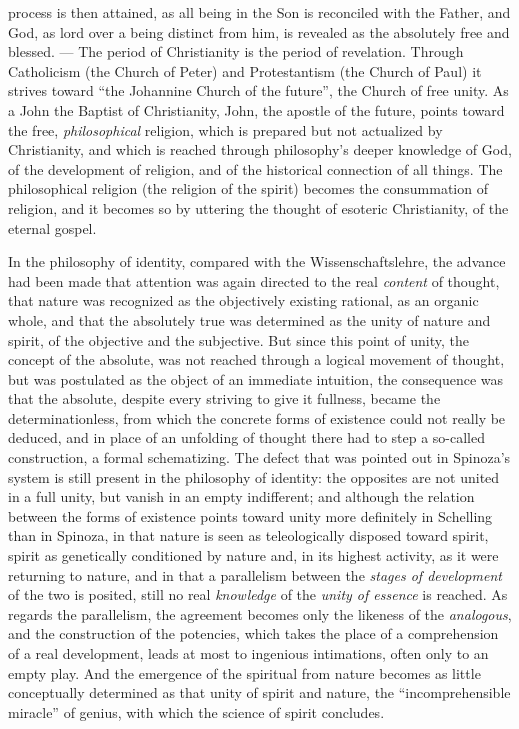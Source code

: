 process is then attained, as all being in the Son is reconciled with the
Father, and God, as lord over a being distinct from him, is revealed as
the absolutely free and blessed. --- The period of Christianity is the
period of revelation. Through Catholicism (the Church of Peter) and
Protestantism (the Church of Paul) it strives toward ``the Johannine
Church of the future'', the Church of free unity. As a John the Baptist
of Christianity, John, the apostle of the future, points toward the free,
\emph{philosophical} religion, which is prepared but not actualized by
Christianity, and which is reached through philosophy's deeper knowledge
of God, of the development of religion, and of the historical connection
of all things. The philosophical religion (the religion of the spirit)
becomes the consummation of religion, and it becomes so by uttering the
thought of esoteric Christianity, of the eternal gospel.

\divrule

In the philosophy of identity, compared with the Wissenschaftslehre,
the advance had been made that attention was again directed to the
real \emph{content} of thought, that nature was recognized as the
objectively existing rational, as an organic whole, and that the
absolutely true was determined as the unity of nature and spirit, of
the objective and the subjective. But since this point of unity, the
concept of the absolute, was not reached through a logical movement of
thought, but was postulated as the object of an immediate intuition,
the consequence was that the absolute, despite every
striving to give it fullness, became the determinationless, from which
the concrete forms of existence could not really be deduced, and in
place of an unfolding of thought there had to step a so-called
construction, a formal schematizing. The defect that was pointed out in
Spinoza's system is still present in the philosophy of identity: the
opposites are not united in a full unity, but vanish in an empty
indifferent; and although the relation between the forms of existence
points toward unity more definitely in Schelling than in Spinoza, in
that nature is seen as teleologically disposed toward spirit, spirit
as genetically conditioned by nature and, in its highest activity, as
it were returning to nature, and in that a parallelism between the
\emph{stages of development} of the two is posited, still no real
\emph{knowledge} of the \emph{unity of essence} is reached. As regards
the parallelism, the agreement becomes only the likeness of the
\emph{analogous}, and the construction of the potencies, which takes the
place of a comprehension of a real development, leads at most to
ingenious intimations, often only to an empty play. And the emergence
of the spiritual from nature becomes as little conceptually determined
as that unity of spirit and nature, the ``incomprehensible miracle''
of genius, with which the science of spirit concludes.


